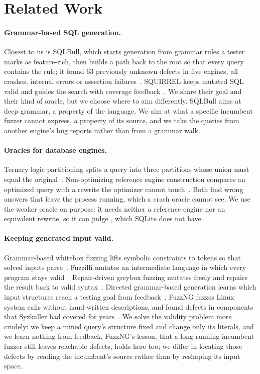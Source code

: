 \section{Related Work}
\label{sec:related}

\paragraph{Grammar-based SQL generation.} Closest to us is SQLBull, which starts
generation from grammar rules a tester marks as feature-rich, then builds a path
back to the root so that every query contains the rule; it found 63 previously
unknown defects in five engines, all crashes, internal errors or assertion
failures~\cite{liang2026sqlbull}. SQUIRREL keeps mutated SQL valid and guides the search with coverage
feedback~\cite{zhong2020squirrel}. We
share their goal and their kind of oracle, but we choose where to aim differently.
SQLBull aims at deep grammar, a property of the language. We aim at what a
specific incumbent fuzzer cannot express, a property of its source, and we take
the queries from another engine's bug reports rather than from a grammar walk.

\paragraph{Oracles for database engines.} Ternary logic partitioning splits a
query into three partitions whose union must equal the
original~\cite{rigger2020tlp}. Non-optimizing reference engine construction
compares an optimized query with a rewrite the optimizer cannot
touch~\cite{rigger2020norec}. Both find wrong answers that leave the process
running, which a crash oracle cannot see. We use the weaker oracle on purpose:
it needs neither a reference engine nor an equivalent rewrite, so it can judge
, which SQLite does not have.

\paragraph{Keeping generated input valid.} Grammar-based whitebox fuzzing lifts
symbolic constraints to tokens so that solved inputs parse~\cite{godefroid2008grammar}.
Fuzzilli mutates an intermediate language in which every program stays
valid~\cite{gross2023fuzzilli}. Repair-driven greybox fuzzing mutates freely and
repairs the result back to valid syntax~\cite{bendrissou2026repair}. Directed
grammar-based generation learns which input structures reach a testing goal
from feedback~\cite{kirschner2025directed}. FuzzNG fuzzes Linux system calls
without hand-written descriptions, and found defects in components that Syzkaller
had covered for years~\cite{bulekov2023fuzzng}. We solve the validity problem
more crudely: we keep a mined query's structure fixed and change only its
literals, and we learn nothing from feedback. FuzzNG's lesson, that a
long-running incumbent fuzzer still leaves reachable defects, holds here too; we
differ in locating those defects by reading the incumbent's source rather than
by reshaping its input space.

